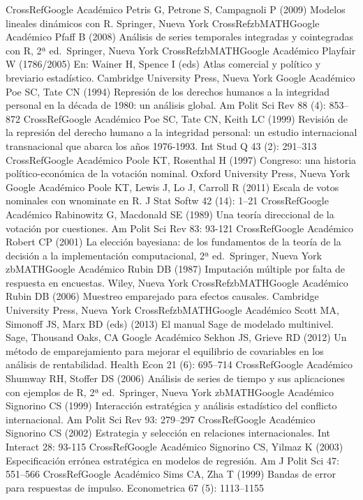 \documentclass[
]{book}
\begin{document}
CrossRefGoogle Académico
Petris G, Petrone S, Campagnoli P (2009) Modelos lineales dinámicos con R. Springer, Nueva York
CrossRefzbMATHGoogle Académico
Pfaff B (2008) Análisis de series temporales integradas y cointegradas con R, 2ª ed.~Springer, Nueva York
CrossRefzbMATHGoogle Académico
Playfair W (1786/2005) En: Wainer H, Spence I (eds) Atlas comercial y político y breviario estadístico. Cambridge University Press, Nueva York
Google Académico
Poe SC, Tate CN (1994) Represión de los derechos humanos a la integridad personal en la década de 1980: un análisis global. Am Polit Sci Rev 88 (4): 853--872
CrossRefGoogle Académico
Poe SC, Tate CN, Keith LC (1999) Revisión de la represión del derecho humano a la integridad personal: un estudio internacional transnacional que abarca los años 1976-1993. Int Stud Q 43 (2): 291--313
CrossRefGoogle Académico
Poole KT, Rosenthal H (1997) Congreso: una historia político-económica de la votación nominal. Oxford University Press, Nueva York
Google Académico
Poole KT, Lewis J, Lo J, Carroll R (2011) Escala de votos nominales con wnominate en R. J Stat Softw 42 (14): 1--21
CrossRefGoogle Académico
Rabinowitz G, Macdonald SE (1989) Una teoría direccional de la votación por cuestiones. Am Polit Sci Rev 83: 93-121
CrossRefGoogle Académico
Robert CP (2001) La elección bayesiana: de los fundamentos de la teoría de la decisión a la implementación computacional, 2ª ed.~Springer, Nueva York
zbMATHGoogle Académico
Rubin DB (1987) Imputación múltiple por falta de respuesta en encuestas. Wiley, Nueva York
CrossRefzbMATHGoogle Académico
Rubin DB (2006) Muestreo emparejado para efectos causales. Cambridge University Press, Nueva York
CrossRefzbMATHGoogle Académico
Scott MA, Simonoff JS, Marx BD (eds) (2013) El manual Sage de modelado multinivel. Sage, Thousand Oaks, CA
Google Académico
Sekhon JS, Grieve RD (2012) Un método de emparejamiento para mejorar el equilibrio de covariables en los análisis de rentabilidad. Health Econ 21 (6): 695--714
CrossRefGoogle Académico
Shumway RH, Stoffer DS (2006) Análisis de series de tiempo y sus aplicaciones con ejemplos de R, 2ª ed.~Springer, Nueva York
zbMATHGoogle Académico
Signorino CS (1999) Interacción estratégica y análisis estadístico del conflicto internacional. Am Polit Sci Rev 93: 279--297
CrossRefGoogle Académico
Signorino CS (2002) Estrategia y selección en relaciones internacionales. Int Interact 28: 93-115
CrossRefGoogle Académico
Signorino CS, Yilmaz K (2003) Especificación errónea estratégica en modelos de regresión. Am J Polit Sci 47: 551--566
CrossRefGoogle Académico
Sims CA, Zha T (1999) Bandas de error para respuestas de impulso. Econometrica 67 (5): 1113--1155
\end{document}
